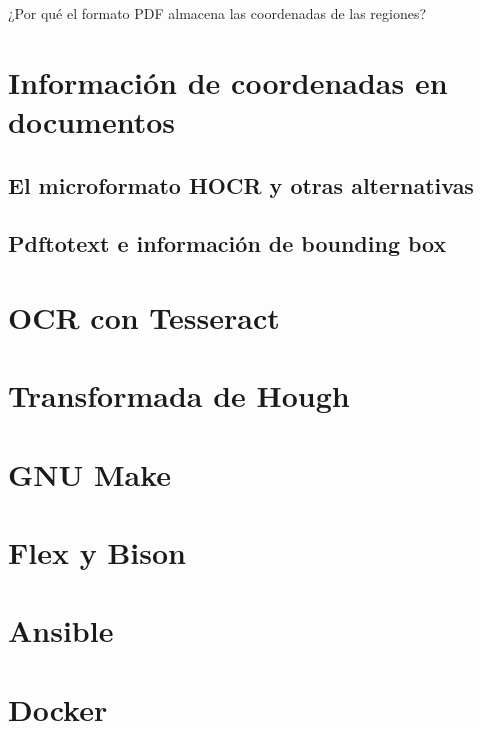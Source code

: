 ¿Por qué el formato PDF almacena las coordenadas de las regiones?

\section{Información de coordenadas en documentos}
\subsection{El microformato HOCR y otras alternativas}
\subsection{Pdftotext e información de bounding box}

\section{OCR con Tesseract}
\section{Transformada de Hough}
\section{GNU Make}
\section{Flex y Bison}
\section{Ansible}
\section{Docker}


